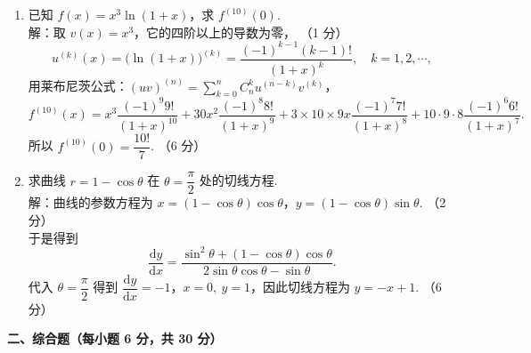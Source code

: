 \documentclass[a4paper,11pt]{ctexart}
\newcommand{\dd}{\mathrm{d}}
\newcommand{\score}[1]{\hfill（#1）}
\begin{document}
\begin{enumerate}[label=\arabic*., leftmargin=2em, itemsep=1.0em, topsep=0.5em]
  \item 已知 $f(x) = x^3 \ln(1+x)$，求 $f^{(10)}(0)$.\\[0.3em]
  解：取 $v(x) = x^3$，它的四阶以上的导数为零， \score{1 分}
  \[
    u^{(k)}(x) = \bigl(\ln(1+x)\bigr)^{(k)} = \frac{(-1)^{k-1}(k-1)!}{(1+x)^k},\quad k = 1, 2, \cdots, \tag*{（3 分）}
  \]
  用莱布尼茨公式：$(uv)^{(n)} = \sum\limits_{k=0}^{n} C_n^k u^{(n-k)} v^{(k)}$，
  \[
    f^{(10)}(x) = x^3\frac{(-1)^9 9!}{(1+x)^{10}} + 30x^2\frac{(-1)^8 8!}{(1+x)^9} + 3\times 10\times 9x\frac{(-1)^7 7!}{(1+x)^8} + 10\cdot 9\cdot 8\frac{(-1)^6 6!}{(1+x)^7}.
  \]
  所以 $f^{(10)}(0) = \dfrac{10!}{7}$. \score{6 分}

  \item 求曲线 $r = 1 - \cos\theta$ 在 $\theta = \dfrac{\pi}{2}$ 处的切线方程.\\[0.3em]
  解：曲线的参数方程为 $x = (1 - \cos\theta)\cos\theta$，$y = (1 - \cos\theta)\sin\theta$. \score{2 分}\\[0.2em]
  于是得到
  \[
    \frac{\dd y}{\dd x} = \frac{\sin^2\theta + (1 - \cos\theta)\cos\theta}{2\sin\theta\cos\theta - \sin\theta}. \tag*{（4 分）}
  \]
  代入 $\theta = \dfrac{\pi}{2}$ 得到 $\dfrac{\dd y}{\dd x} = -1$，$x = 0,\ y = 1$，因此切线方程为 $y = -x + 1$. \score{6 分}
\end{enumerate}

\vspace{0.8em}

\textbf{二、综合题（每小题 6 分，共 30 分）}
\end{document}
